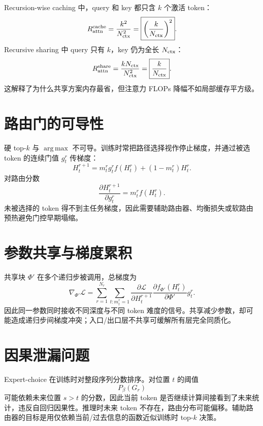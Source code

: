 \documentclass[UTF8,12pt,a4paper,fontset=none]{ctexart}
\numberwithin{equation}{section}
\newcommand{\Loss}{\mathcal{L}}
\newcommand{\argmax}{\operatorname*{arg\,max}}
\begin{document}
Recursion-wise caching 中，query 和 key 都只含 $k$ 个激活 token：
\begin{equation}
 R_{\rm attn}^{\rm cache}
 =\frac{k^2}{N_{\rm ctx}^2}
 =\boxed{\left(\frac{k}{N_{\rm ctx}}\right)^2}.
\end{equation}
Recursive sharing 中 query 只有 $k$，key 仍为全长 $N_{\rm ctx}$：
\begin{equation}
 R_{\rm attn}^{\rm share}
 =\frac{kN_{\rm ctx}}{N_{\rm ctx}^2}
 =\boxed{\frac{k}{N_{\rm ctx}}}.
\end{equation}
这解释了为什么共享方案内存最省，但注意力 FLOPs 降幅不如局部缓存平方级。

\section{路由门的可导性}
硬 top-$k$ 与 $\argmax$ 不可导。训练时常把路径选择视作停止梯度，并通过被选 token 的连续门值 $g_t^r$ 传梯度：
\begin{equation}
 H_t^{r+1}=m_t^r g_t^r f(H_t^r)+(1-m_t^r)H_t^r.
\end{equation}
对路由分数
\begin{equation}
 \frac{\partial H_t^{r+1}}{\partial g_t^r}=m_t^r f(H_t^r).
\end{equation}
未被选择的 token 得不到主任务梯度，因此需要辅助路由器、均衡损失或软路由预热避免门控早期塌缩。

\section{参数共享与梯度累积}
共享块 $\Phi'$ 在多个递归步被调用，总梯度为
\begin{equation}
 \nabla_{\Phi'}\Loss
 =\sum_{r=1}^{N_r}\sum_{t:m_t^r=1}
 \frac{\partial\Loss}{\partial H_t^{r+1}}
 \frac{\partial f_{\Phi'}(H_t^r)}{\partial\Phi'}g_t^r.
\end{equation}
因此同一参数同时接收不同深度与不同 token 难度的信号。共享减少参数，却可能造成递归步间梯度冲突；入口/出口层不共享可缓解所有层完全同质化。

\section{因果泄漏问题}
Expert-choice 在训练时对整段序列分数排序。对位置 $t$ 的阈值
\begin{equation}
 P_\beta(G_r)
\end{equation}
可能依赖未来位置 $s>t$ 的分数，因此当前 token 是否继续计算间接看到了未来统计，违反自回归因果性。推理时未来 token 不存在，路由分布可能偏移。辅助路由器的目标是用仅依赖当前/过去信息的函数近似训练时 top-$k$ 决策。
\end{document}
